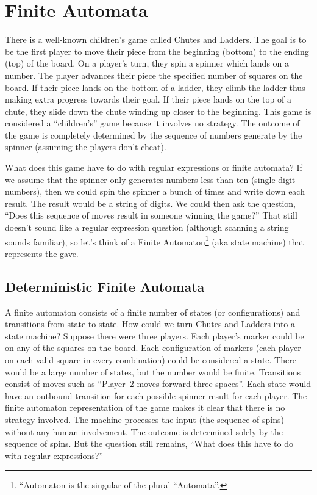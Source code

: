 \documentclass[letterpaper,12pt,openany,reqno]{book}%
\begin{document}
\chapter{Finite Automata}
There is a well-known children's game called Chutes and Ladders. The goal is to be the first player to move their piece from the beginning (bottom) to the ending (top) of the board. On a player's turn, they spin a spinner which lands on a number. The player advances their piece the specified number of squares on the board. If their piece lands on the bottom of a ladder, they climb the ladder thus making extra progress towards their goal. If their piece lands on the top of a chute, they slide down the chute winding up closer to the beginning. This game is considered a ``children's'' game because it involves no strategy. The outcome of the game is completely determined by the sequence of numbers generate by the spinner (assuming the players don't cheat).

What does this game have to do with regular expressions or finite automata? If we assume that the spinner only generates numbers less than ten (single digit numbers), then we could spin the spinner a bunch of times and write down each result. The result would be a string of digits. We could then ask the question, ``Does this sequence of moves result in someone winning the game?'' That still doesn't sound like a regular expression question (although scanning a string sounds familiar), so let's think of a Finite Automaton\footnote{``Automaton is the singular of the plural ``Automata''.} (aka state machine) that represents the gave.

\section{Deterministic Finite Automata}
A finite automaton consists of a finite number of states (or configurations) and transitions from state to state. How could we turn Chutes and Ladders into a state machine? Suppose there were three players. Each player's marker could be on any of the squares on the board. Each configuration of markers (each player on each valid square in every combination) could be considered a state. There would be a large number of states, but the number would be finite. Transitions consist of moves such as ``Player~2 moves forward three spaces''. Each state would have an outbound transition for each possible spinner result for each player. The finite automaton representation of the game makes it clear that there is no strategy involved. The machine processes the input (the sequence of spins) without any human involvement. The outcome is determined solely by the sequence of spins. But the question still remains, ``What does this have to do with regular expressions?''
\end{document}
